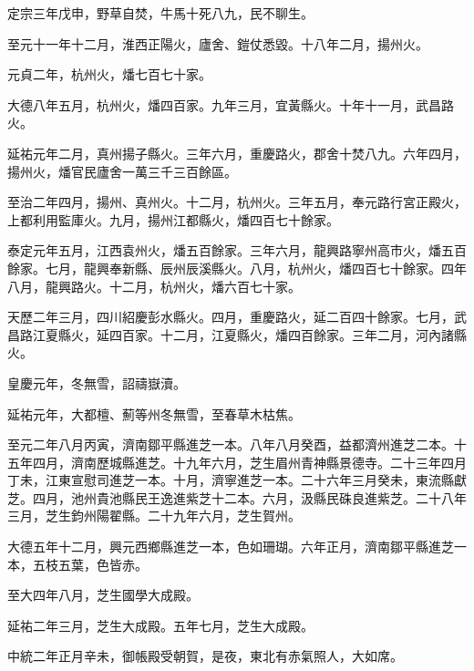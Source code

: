 \begin{pinyinscope}
 定宗三年戊申，野草自焚，牛馬十死八九，民不聊生。



 至元十一年十二月，淮西正陽火，廬舍、鎧仗悉毀。十八年二月，揚州火。



 元貞二年，杭州火，燔七百七十家。



 大德八年五月，杭州火，燔四百家。九年三月，宜黃縣火。十年十一月，武昌路火。



 延祐元年二月，真州揚子縣火。三年六月，重慶路火，郡舍十焚八九。六年四月，揚州火，燔官民廬舍一萬三千三百餘區。



 至治二年四月，揚州、真州火。十二月，杭州火。三年五月，奉元路行宮正殿火，上都利用監庫火。九月，揚州江都縣火，燔四百七十餘家。



 泰定元年五月，江西袁州火，燔五百餘家。三年六月，龍興路寧州高市火，燔五百餘家。七月，龍興奉新縣、辰州辰溪縣火。八月，杭州火，燔四百七十餘家。四年八月，龍興路火。十二月，杭州火，燔六百七十家。



 天歷二年三月，四川紹慶彭水縣火。四月，重慶路火，延二百四十餘家。七月，武昌路江夏縣火，延四百家。十二月，江夏縣火，燔四百餘家。三年二月，河內諸縣火。



 皇慶元年，冬無雪，詔禱嶽瀆。



 延祐元年，大都檀、薊等州冬無雪，至春草木枯焦。



 至元二年八月丙寅，濟南鄒平縣進芝一本。八年八月癸酉，益都濟州進芝二本。十五年四月，濟南歷城縣進芝。十九年六月，芝生眉州青神縣景德寺。二十三年四月丁未，江東宣慰司進芝一本。十月，濟寧進芝一本。二十六年三月癸未，東流縣獻芝。四月，池州貴池縣民王逸進紫芝十二本。六月，汲縣民硃良進紫芝。二十八年三月，芝生鈞州陽翟縣。二十九年六月，芝生賀州。



 大德五年十二月，興元西鄉縣進芝一本，色如珊瑚。六年正月，濟南鄒平縣進芝一本，五枝五葉，色皆赤。



 至大四年八月，芝生國學大成殿。



 延祐二年三月，芝生大成殿。五年七月，芝生大成殿。



 中統二年正月辛未，御帳殿受朝賀，是夜，東北有赤氣照人，大如席。




\end{pinyinscope}
